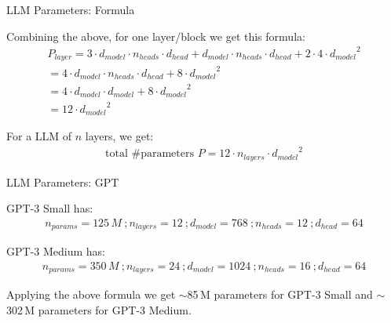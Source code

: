 
\begin{vbframe}{LLM Parameters: Formula}

\vfill

Combining the above, for one layer/block we get this formula:
\begin{equation*}
\begin{array}{c}
P_{layer} = 3 \cdot d_{model} \cdot n_{heads} \cdot d_{head} + d_{model} \cdot n_{heads} \cdot d_{head} + 2 \cdot 4 \cdot {d_{model}}^2 \\ [8pt]
 = 4 \cdot d_{model} \cdot n_{heads} \cdot d_{head} + 8 \cdot {d_{model}}^2 \\ [8pt]
 = 4 \cdot d_{model} \cdot d_{model} + 8 \cdot {d_{model}}^2 \\ [8pt]
 = 12 \cdot {d_{model}}^2
\end{array}
\end{equation*}

\vskip5mm

For a LLM of $n$ layers, we get:
\begin{equation*}
\begin{array}{c}
\mbox{total \# parameters\ \ } P = 12 \cdot n_{layers} \cdot {d_{model}}^2
\end{array}
\end{equation*}

\vfill

\end{vbframe}


\begin{vbframe}{LLM Parameters: GPT}

\vfill

GPT-3 Small has:
\begin{equation*}
\begin{array}{l}
n_{params} = 125\,M ~; n_{layers} = 12 ~; d_{model} = 768 ~; n_{heads} = 12 ~; d_{head} = 64 
\end{array}
\end{equation*}

\vskip2mm

GPT-3 Medium has:
\begin{equation*}
\begin{array}{l}
n_{params} = 350\,M ~; n_{layers} = 24 ~; d_{model} = 1024 ~; n_{heads} = 16 ~; d_{head} = 64 
\end{array}
\end{equation*}

\vskip2mm

Applying the above formula we get $\sim$85\,M parameters for GPT-3 Small and $\sim$302\,M parameters for GPT-3 Medium. 



\vfill

\end{vbframe}


